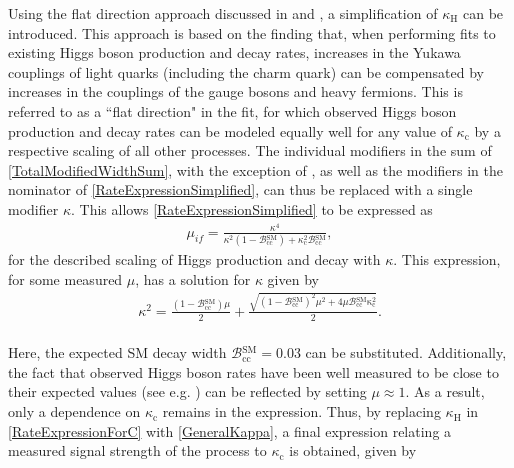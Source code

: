 Using the flat direction approach discussed in \cite{PhysRevD.100.073013} and \cite{PhysRevD.103.095023}, a simplification of $\kappa_{\mathrm{H}}$ can be introduced. This approach is based on the finding that, when performing fits to existing Higgs boson production and decay rates, increases in the Yukawa couplings of light quarks (including the charm quark) can be compensated by increases in the couplings of the gauge bosons and heavy fermions. This is referred to as a ``flat direction" in the fit, for which observed Higgs boson production and decay rates can be modeled equally well for any value of $\kappa_{\mathrm{c}}$ by a respective scaling of all other processes. The individual modifiers in the sum of \autoref{TotalModifiedWidthSum}, with the exception of \kappac, as well as the modifiers in the nominator of \autoref{RateExpressionSimplified}, can thus be replaced with a single modifier $\kappa$. This allows \autoref{RateExpressionSimplified} to be expressed as
\begin{align}
    \mu_{if} = \frac{\kappa^4}{\kappa^2(1 - \mathcal{B}\mathrm{^{SM}_{cc}}) + \kappa_{\mathrm{c}}^2\mathcal{B}\mathrm{^{SM}_{cc}}},
\end{align}
for the described scaling of Higgs production and decay with $\kappa$. This expression, for some measured $\mu$, has a solution for $\kappa$ given by
\begin{align}
    \kappa^2 = \frac{(1 - \mathcal{B}\mathrm{^{SM}_{cc}})\mu}{2} + \frac{\sqrt{{(1 - \mathcal{B}\mathrm{^{SM}_{cc}})^2\mu^2} + 4\mu\mathcal{B}\mathrm{^{SM}_{cc}\kappa_{\mathrm{c}}^2}}}{2}. \label{GeneralKappa}
\end{align}
\\
Here, the expected SM decay width $\mathcal{B}\mathrm{^{SM}_{cc}} = 0.03$ can be substituted. Additionally, the fact that observed Higgs boson rates have been well measured to be close to their expected values (see e.g. \cite{HiggsRateMeasurementsCMS}) can be reflected by setting $\mu \approx 1$. As a result, only a dependence on $\kappa_{\mathrm{c}}$ remains in the expression. Thus, by replacing $\kappa_{\mathrm{H}}$ in \autoref{RateExpressionForC} with \autoref{GeneralKappa}, a final expression relating a measured signal strength of the \cHZZsen process to $\kappa_{\mathrm{c}}$ is obtained, given by


